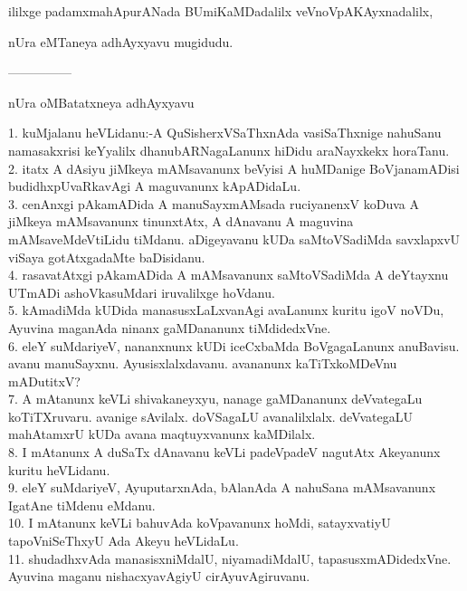 \documentclass{article}
\begin{document}
\begin{center}
ililxge padamxmahApurANada BUmiKaMDadalilx veVnoVpAKAyxnadalilx,
\end{center}

\begin{center}
nUra eMTaneya adhAyxyavu mugidudu.
\end{center}

\begin{center}
---------------
\end{center}

\begin{center}
nUra oMBatatxneya adhAyxyavu
\end{center}

1. kuMjalanu heVLidanu:-A QuSisherxVSaThxnAda vasiSaThxnige nahuSanu namasakxrisi keYyalilx dhanubARNagaLanunx hiDidu araNayxkekx horaTanu.\\
2. itatx A dAsiyu jiMkeya mAMsavanunx beVyisi A huMDanige BoVjanamADisi budidhxpUvaRkavAgi A maguvanunx kApADidaLu.\\
3. cenAnxgi pAkamADida A manuSayxmAMsada ruciyanenxV koDuva A jiMkeya mAMsavanunx tinunxtAtx, A dAnavanu A maguvina mAMsaveMdeVtiLidu tiMdanu. aDigeyavanu kUDa saMtoVSadiMda savxlapxvU viSaya gotAtxgadaMte baDisidanu.\\
4. rasavatAtxgi pAkamADida A mAMsavanunx saMtoVSadiMda A deYtayxnu UTmADi ashoVkasuMdari iruvalilxge hoVdanu.\\
5. kAmadiMda kUDida manasusxLaLxvanAgi avaLanunx kuritu igoV noVDu, Ayuvina maganAda ninanx gaMDananunx tiMdidedxVne.\\
6. eleY suMdariyeV, nananxnunx kUDi iceCxbaMda BoVgagaLanunx anuBavisu. avanu manuSayxnu. Ayusisxlalxdavanu. avananunx kaTiTxkoMDeVnu mADutitxV?\\
7. A mAtanunx keVLi shivakaneyxyu, nanage gaMDananunx deVvategaLu koTiTXruvaru. avanige sAvilalx. doVSagaLU avanalilxlalx. deVvategaLU mahAtamxrU kUDa avana maqtuyxvanunx kaMDilalx.\\
8. I mAtanunx A duSaTx dAnavanu keVLi padeVpadeV nagutAtx Akeyanunx kuritu heVLidanu.\\
9. eleY suMdariyeV, AyuputarxnAda, bAlanAda A nahuSana mAMsavanunx IgatAne tiMdenu eMdanu.\\
10. I mAtanunx keVLi bahuvAda koVpavanunx hoMdi, satayxvatiyU tapoVniSeThxyU Ada Akeyu heVLidaLu.\\
11. shudadhxvAda manasisxniMdalU, niyamadiMdalU, tapasusxmADidedxVne. Ayuvina maganu nishacxyavAgiyU cirAyuvAgiruvanu.\\
\end{document}
